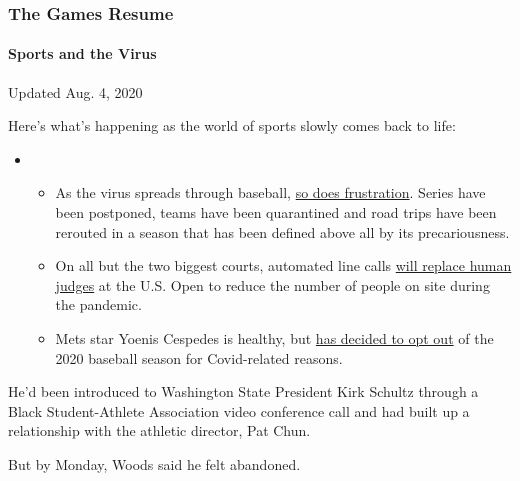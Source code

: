 \hypertarget{the-games-resume}{%
\subsubsection{The Games Resume}\label{the-games-resume}}

\hypertarget{sports-and-the-virus}{%
\paragraph{Sports and the Virus}\label{sports-and-the-virus}}

Updated Aug. 4, 2020

Here's what's happening as the world of sports slowly comes back to
life:

\begin{itemize}
\item
  \begin{itemize}
  \tightlist
  \item
    As the virus spreads through baseball,
    \href{https://www.nytimes.com/2020/08/03/sports/baseball/mlb-coronavirus-outbreak.html?action=click\&pgtype=Article\&state=default\&region=MAIN_CONTENT_2\&context=storylines_keepup}{so
    does frustration}. Series have been postponed, teams have been
    quarantined and road trips have been rerouted in a season that has
    been defined above all by its precariousness.
  \item
    On all but the two biggest courts, automated line calls
    \href{https://www.nytimes.com/2020/08/03/sports/tennis/us-open-hawkeye-line-judges.html?action=click\&pgtype=Article\&state=default\&region=MAIN_CONTENT_2\&context=storylines_keepup}{will
    replace human judges} at the U.S. Open to reduce the number of
    people on site during the pandemic.
  \item
    Mets star Yoenis Cespedes is healthy, but
    \href{https://www.nytimes.com/2020/08/02/sports/baseball/Yoenis-cespedes-opt-out-rule.html?action=click\&pgtype=Article\&state=default\&region=MAIN_CONTENT_2\&context=storylines_keepup}{has
    decided to opt out} of the 2020 baseball season for Covid-related
    reasons.
  \end{itemize}
\end{itemize}

He'd been introduced to Washington State President Kirk Schultz through
a Black Student-Athlete Association video conference call and had built
up a relationship with the athletic director, Pat Chun.

But by Monday, Woods said he felt abandoned.

